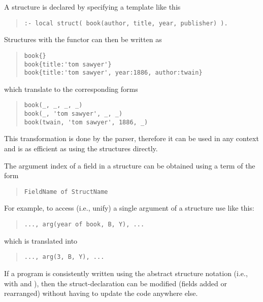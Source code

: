 A structure is declared by specifying a template like this
\begin{quote}
\begin{verbatim}
:- local struct( book(author, title, year, publisher) ).
\end{verbatim}
\end{quote}
Structures with the functor  can then be written as%
%
\begin{quote}
\begin{verbatim}
book{}
book{title:'tom sawyer'}
book{title:'tom sawyer', year:1886, author:twain}
\end{verbatim}
\end{quote}
which translate to the corresponding forms
\begin{quote}
\begin{verbatim}
book(_, _, _, _)
book(_, 'tom sawyer', _, _)
book(twain, 'tom sawyer', 1886, _)
\end{verbatim}
\end{quote}
This transformation is done by the parser, therefore it can
be used in any context and is as efficient as using the structures
directly.

The argument index of a field in a structure can be obtained
using a term of the form
\begin{quote}
\begin{verbatim}
FieldName of StructName
\end{verbatim}
\end{quote}
For example, to access (i.e., unify) a single argument of a structure
use  like this:
\begin{quote}
\begin{verbatim}
..., arg(year of book, B, Y), ...
\end{verbatim}
\end{quote}
which is translated into
\begin{quote}
\begin{verbatim}
..., arg(3, B, Y), ...
\end{verbatim}
\end{quote}

If a program is consistently written using the abstract structure notation
(i.e., with  and ), then the struct-declaration
can be modified (fields added or rearranged) without having to update the code
anywhere else.


